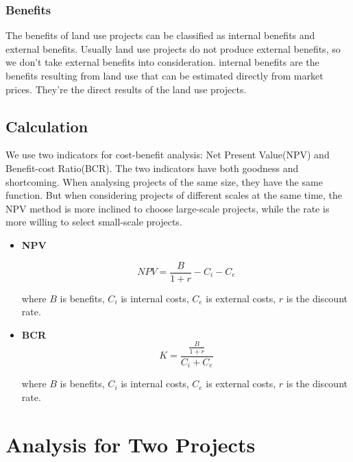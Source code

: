 \documentclass{mcmthesis}
\begin{document}
			\subsubsection{Benefits}
			
				The benefits of land use projects can be classified as internal benefits and external benefits. Usually land use projects do not produce external benefits, so we don’t take external benefits into consideration. internal benefits are the benefits resulting from land use that can be estimated directly from market prices. They’re the direct results of the land use projects.
		
		
		\subsection{Calculation}
		
			We use two indicators for cost-benefit analysis: Net Present Value(NPV) and Benefit-cost Ratio(BCR). The two indicators have both goodness and shortcoming. When analysing projects of the same size, they have the same function. But when considering projects of different scales at the same time, the NPV method is more inclined to choose large-scale projects, while the rate is more willing to select small-scale projects.
			
			\begin{itemize}
				
				\item \textbf{NPV}
				
					\begin{equation}	
						N P V = \frac { B } { 1 + r } - C _ { i } - C _ { e }
					\end{equation}
					
					where $B$ is benefits, $C_i$ is internal costs, $C_e$ is external costs, $r$ is the discount rate.
				
				\item \textbf{BCR}				
					\begin{equation}
						K = \frac { \frac { B } { 1 + r } } { C _ { i } + C _ { e } }
					\end{equation}
					
					where $B$ is benefits, $C_i$ is internal costs, $C_e$ is external costs, $r$ is the discount rate.
				
			\end{itemize}
		

	\section{Analysis for Two Projects}
	
\end{document}
